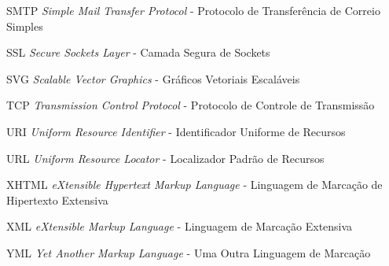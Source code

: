 \begin{siglas}
	\item[SMTP] \textit{Simple Mail Transfer Protocol} - Protocolo de Transferência de Correio Simples
	\item[SSL] \textit{Secure Sockets Layer} - Camada Segura de Sockets
	\item[SVG] \textit{Scalable Vector Graphics} - Gráficos Vetoriais Escaláveis
	\item[TCP] \textit{Transmission Control Protocol} - Protocolo de Controle de Transmissão
	\item[URI] \textit{Uniform Resource Identifier} - Identificador Uniforme de Recursos
	\item[URL] \textit{Uniform Resource Locator} - Localizador Padrão de Recursos
	\item[XHTML] \textit{eXtensible Hypertext Markup Language} - Linguagem de Marcação de Hipertexto Extensiva
	\item[XML] \textit{eXtensible Markup Language} - Linguagem de Marcação Extensiva
	\item[YML] \textit{Yet Another Markup Language} - Uma Outra Linguagem de Marcação\footnotemark[2]
\end{siglas}

